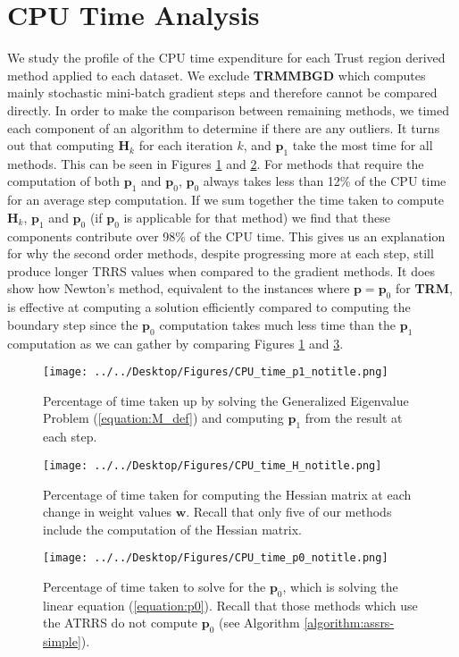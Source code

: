 \documentclass[letterpaper,12pt,titlepage,oneside,final]{book}
\begin{document}
	
	
	\section{CPU Time Analysis}
	We study the profile of the CPU time expenditure for each Trust region derived method applied to each dataset. We exclude \textbf{TRMMBGD} which computes mainly stochastic mini-batch gradient steps and therefore cannot be compared directly. In order to make the comparison between remaining methods, we timed each component of an algorithm to determine if there are any outliers. It turns out that computing $\mathbf{H}_{k}$ for each iteration $k$, and $\mathbf{p}_{1}$ take the most time for all methods. This can be seen in Figures \ref{figure:p1_time} and \ref{figure:H_time}. For methods that require the computation of both $\mathbf{p}_{1}$ and $\mathbf{p}_{0}$, $\mathbf{p}_{0}$ always takes less than 12\% of the CPU time for an average step computation. If we sum together the time taken to compute $\mathbf{H}_{k}$, $\mathbf{p}_{1}$ and $\mathbf{p}_{0}$ (if $\mathbf{p}_{0}$ is applicable for that method) we find that these components contribute over 98\% of the CPU time. This gives us an explanation for why the second order methods, despite progressing more at each step, still produce longer TRRS values when compared to the gradient methods. It does show how Newton's method, equivalent to the instances where $\mathbf{p} = \mathbf{p}_{0}$ for \textbf{TRM}, is effective at computing a solution efficiently compared to computing the boundary step since the $\mathbf{p}_{0}$ computation takes much less time than the $\mathbf{p}_{1}$ computation as we can gather by comparing Figures \ref{figure:p1_time} and \ref{figure:p0_time}.
	\begin{figure}
		\centering
		\texttt{[image: ../../Desktop/Figures/CPU\_time\_p1\_notitle.png]}
		\caption{Percentage of time taken up by solving the Generalized Eigenvalue Problem (\ref{equation:M_def}) and computing $\mathbf{p}_{1}$ from the result at each step.}
		\label{figure:p1_time}
	\end{figure}
	\begin{figure}
		\centering
		\texttt{[image: ../../Desktop/Figures/CPU\_time\_H\_notitle.png]}
		\caption{Percentage of time taken for computing the Hessian matrix at each change in weight values $\mathbf{w}$. Recall that only five of our methods include the computation of the Hessian matrix. }
		\label{figure:H_time}
	\end{figure}
\begin{figure}
	\centering
	\texttt{[image: ../../Desktop/Figures/CPU\_time\_p0\_notitle.png]}
	\caption{Percentage of time taken to solve for the $\mathbf{p}_{0}$, which is solving the linear equation (\ref{equation:p0}). Recall that those methods which use the ATRRS do not compute $\mathbf{p}_{0}$ (see Algorithm \ref{algorithm:assrs-simple}).}
	\label{figure:p0_time}
\end{figure}
	
\end{document}
